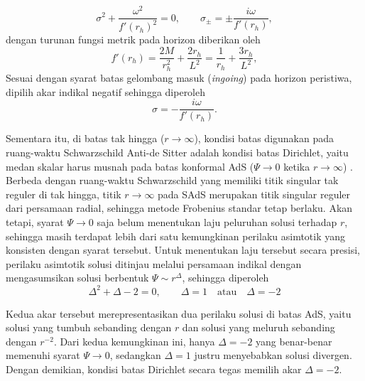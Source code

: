\begin{equation}
    \sigma^2+\frac{\omega^2}{f'(r_h)^2}=0,
    \qquad
    \sigma_{\pm}=\pm\frac{i\omega}{f'(r_h)},
    \label{eq:indicial_horizon_sads}
\end{equation}
dengan turunan fungsi metrik pada horizon diberikan oleh
\begin{equation}
    f'(r_h)=\frac{2M}{r_h^2}+\frac{2r_h}{L^2}
    =\frac{1}{r_h}+\frac{3r_h}{L^2},
    \label{eq:fprime_sads}
\end{equation}
Sesuai dengan syarat batas gelombang masuk (\textit{ingoing}) pada horizon peristiwa, dipilih akar indikal negatif sehingga diperoleh
\begin{equation}
\sigma=-\frac{i\omega}{f'(r_h)}.
\end{equation}

Sementara itu, di batas tak hingga ($r\rightarrow\infty$), kondisi batas digunakan pada
ruang-waktu Schwarzschild Anti-de Sitter adalah kondisi batas Dirichlet, yaitu medan skalar
harus musnah pada batas konformal AdS ($\Psi\rightarrow0$ ketika $r\rightarrow\infty$)
\parencite{Horowitz2000,MossNorman2002}. Berbeda dengan ruang-waktu Schwarzschild yang
memiliki titik singular tak reguler di tak hingga, titik $r\rightarrow\infty$ pada SAdS
merupakan titik singular reguler dari persamaan radial, sehingga metode Frobenius standar
tetap berlaku. Akan tetapi, syarat $\Psi\rightarrow0$ saja belum menentukan laju peluruhan
solusi terhadap $r$, sehingga masih terdapat lebih dari satu kemungkinan perilaku asimtotik
yang konsisten dengan syarat tersebut. Untuk menentukan laju tersebut secara presisi,
perilaku asimtotik solusi ditinjau melalui persamaan indikal dengan mengasumsikan solusi
berbentuk $\Psi\sim r^\Delta$, sehingga diperoleh
\begin{equation}
    \Delta^2+\Delta-2=0, \qquad \Delta=1 \quad\text{atau}\quad \Delta=-2
    \label{eq:indicial_ads}
\end{equation}

Kedua akar tersebut merepresentasikan dua perilaku solusi di batas AdS, yaitu solusi yang
tumbuh sebanding dengan $r$ dan solusi yang meluruh sebanding dengan $r^{-2}$. Dari kedua
kemungkinan ini, hanya $\Delta=-2$ yang benar-benar memenuhi syarat $\Psi\rightarrow0$,
sedangkan $\Delta=1$ justru menyebabkan solusi divergen. Dengan demikian, kondisi batas
Dirichlet secara tegas memilih akar $\Delta=-2$.

